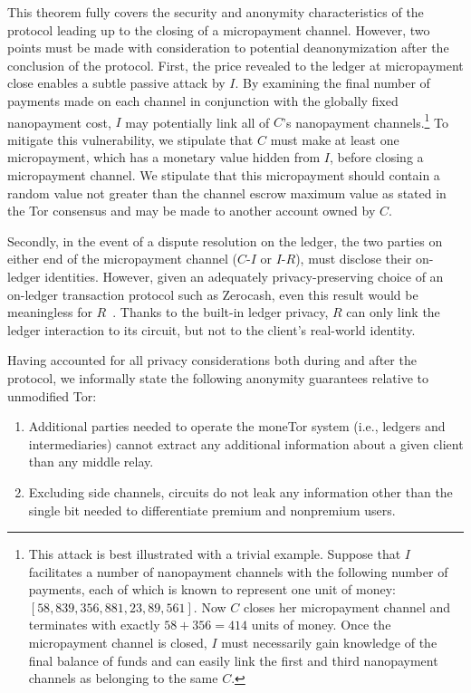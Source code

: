 This theorem fully covers the security and anonymity characteristics of the protocol leading up to the closing of a micropayment channel.
However, two points must be made with consideration to potential deanonymization after the conclusion of the protocol.
First, the price revealed to the ledger at micropayment close enables a subtle passive attack by $I$.
By examining the final number of payments made on each channel in conjunction with the globally fixed nanopayment cost, $I$ may potentially link all of $C$'s nanopayment channels.\footnote{This attack is best illustrated with a trivial example.
Suppose that $I$ facilitates a number of nanopayment channels with the following number of payments, each of which is known to represent one unit of money: $[58, 839, 356, 881, 23, 89, 561]$.
Now $C$ closes her micropayment channel and terminates with exactly $58 + 356 = 414$ units of money.
Once the micropayment channel is closed, $I$ must necessarily gain knowledge of the final balance of funds and can easily link the first and third nanopayment channels as belonging to the same $C$.}
To mitigate this vulnerability, we stipulate that $C$ must make at least one micropayment, which has a monetary value hidden from $I$, before closing a micropayment channel.
We stipulate that this micropayment should contain a random value not greater than the channel escrow maximum value as stated in the Tor consensus and may be made to another account owned by $C$.

Secondly, in the event of a dispute resolution on the ledger, the two parties on either end of the micropayment channel ($C$-$I$ or $I$-$R$), must disclose their on-ledger identities.
However, given an adequately privacy-preserving choice of an on-ledger transaction protocol such as Zerocash, even this result would be meaningless for $R$~\cite{sasson2014zerocash}.
Thanks to the built-in ledger privacy, $R$ can only link the ledger interaction to its circuit, but not to the client's real-world identity.

Having accounted for all privacy considerations both during and after the protocol, we informally state the following anonymity guarantees relative to unmodified Tor:

\begin{enumerate}
\item Additional parties needed to operate the moneTor system (i.e., ledgers and intermediaries) cannot extract any additional information about a given client than any middle relay.
\item Excluding side channels, circuits do not leak any information other than the single bit needed to differentiate premium and nonpremium users.
\end{enumerate}

